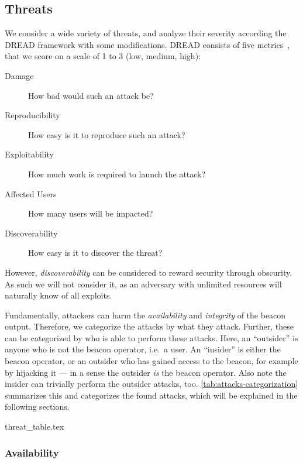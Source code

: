 \subsection{Threats}
We consider a wide variety of threats, and analyze their severity according the DREAD framework with some modifications. DREAD consists of five metrics~\cite{dread}, that we score on a scale of 1 to 3 (low, medium, high):
\begin{description}
    \item [Damage] How bad would such an attack be?
    \item [Reproducibility] How easy is it to reproduce such an attack?
    \item [Exploitability] How much work is required to launch the attack?
    \item [Affected Users] How many users will be impacted?
    \item [Discoverability] How easy is it to discover the threat?
\end{description}

However, \emph{discoverability} can be considered to reward security through obscurity. As such we will not consider it, as an adversary with unlimited resources will naturally know of all exploits.

Fundamentally, attackers can harm the \emph{availability} and \emph{integrity} of the beacon output. Therefore, we categorize the attacks by what they attack. Further, these can be categorized by who is able to perform these attacks. Here, an \enquote{outsider} is anyone who is not the beacon operator, i.e.\ a user. An \enquote{insider} is either the beacon operator, or an outsider who has gained access to the beacon, for example by hijacking it --- in a sense the outsider \emph{is} the beacon operator. Also note the insider can trivially perform the outsider attacks, too. \cref{tab:attacks-categorization} summarizes this and categorizes the found attacks, which will be explained in the following sections.

{threat_table.tex}


\subsubsection{Availability}

